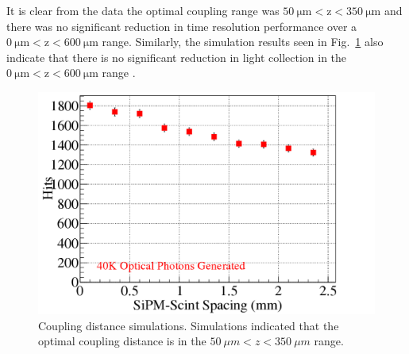 It is clear from the data the optimal coupling range was $\mathrm{50\ \mu m < z < 350\ \mu m}$ and there was no significant reduction in time resolution performance over a $\mathrm{0\ \mu m < z < 600\ \mu m}$ range.  Similarly, the simulation results seen in Fig.~\ref{fig:spacing_sim} also indicate that there is no significant reduction in light collection in the $\mathrm{0\ \mu m < z < 600\ \mu m}$ range \cite{puneet_sim_talk}.
	\begin{figure}[!htb]
		\centering
		\includegraphics[width=1.0\columnwidth]{misalignment/figs/spacing_sim}
		\caption{Coupling distance simulations. Simulations indicated that the optimal coupling distance is in the $50\ \mu m < z < 350\ \mu m$ range.}
		\label{fig:spacing_sim}
	\end{figure}


